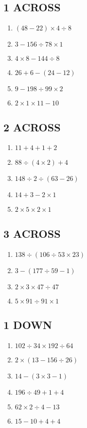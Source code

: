 \documentclass{exam}
\begin{document}
\begin{multicols*}{2}
\subsection*{1 ACROSS}
\begin{enumerate}[1)]
\item $\left(48 - 22\right) \times 4 \div 8$
\item $3 - 156 \div 78 \times 1$
\item $4 \times 8 - 144 \div 8$
\item $26 + 6 - \left(24 - 12\right)$
\item $9 - 198 \div 99 \times 2$
\item $2 \times 1 \times 11 - 10$
\end{enumerate}
\subsection*{2 ACROSS}
\begin{enumerate}[1)]
\item $11 + 4 + 1 + 2$
\item $88 \div \left(4 \times 2\right) + 4$
\item $148 \div 2 \div \left(63 - 26\right)$
\item $14 + 3 - 2 \times 1$
\item $2 \times 5 \times 2 \times 1$
\end{enumerate}
\subsection*{3 ACROSS}
\begin{enumerate}[1)]
\item $138 \div \left(106 \div 53 \times 23\right)$
\item $3 - \left(177 \div 59 - 1\right)$
\item $2 \times 3 \times 47 \div 47$
\item $5 \times 91 \div 91 \times 1$
\end{enumerate}
\subsection*{1 DOWN}
\begin{enumerate}[1)]
\item $102 \div 34 \times 192 \div 64$
\item $2 \times \left(13 - 156 \div 26\right)$
\item $14 - \left(3 \times 3 - 1\right)$
\item $196 \div 49 + 1 + 4$
\item $62 \times 2 \div 4 - 13$
\item $15 - 10 + 4 + 4$
\end{enumerate}

\end{multicols*}
\end{document}

